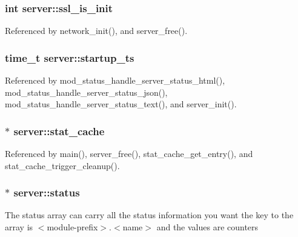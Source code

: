 \hypertarget{structserver_a40cff5804e1175f2c61a5f40ed169ca1}{
\subsubsection[{ssl\-\_\-is\-\_\-init}]{\setlength{\rightskip}{0pt plus 5cm}int server\-::ssl\-\_\-is\-\_\-init}}\label{structserver_a40cff5804e1175f2c61a5f40ed169ca1}


Referenced by network\-\_\-init(), and server\-\_\-free().

\hypertarget{structserver_aed83f71d35709f7585b17127be8dd175}{
\subsubsection[{startup\-\_\-ts}]{\setlength{\rightskip}{0pt plus 5cm}time\-\_\-t server\-::startup\-\_\-ts}}\label{structserver_aed83f71d35709f7585b17127be8dd175}


Referenced by mod\-\_\-status\-\_\-handle\-\_\-server\-\_\-status\-\_\-html(), mod\-\_\-status\-\_\-handle\-\_\-server\-\_\-status\-\_\-json(), mod\-\_\-status\-\_\-handle\-\_\-server\-\_\-status\-\_\-text(), and server\-\_\-init().

\hypertarget{structserver_aaa23f868ab71654b419a5ab8e8e61b46}{
\subsubsection[{stat\-\_\-cache}]{$\ast$ server\-::stat\-\_\-cache}}\label{structserver_aaa23f868ab71654b419a5ab8e8e61b46}


Referenced by main(), server\-\_\-free(), stat\-\_\-cache\-\_\-get\-\_\-entry(), and stat\-\_\-cache\-\_\-trigger\-\_\-cleanup().

\hypertarget{structserver_a0c01038b8f323d870c319386b35a4b54}{
\subsubsection[{status}]{$\ast$ server\-::status}}\label{structserver_a0c01038b8f323d870c319386b35a4b54}
The status array can carry all the status information you want the key to the array is $<$module-\/prefix$>$.$<$name$>$ and the values are counters

